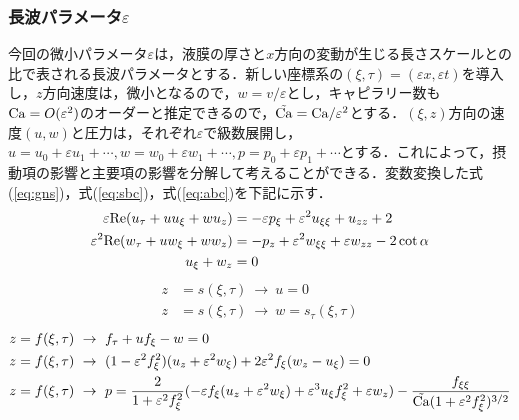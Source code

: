 \documentclass[autodetect-engine,dvipdfmx-if-dvi,ja=standard,a4paper,11pt]{bxjsarticle} %
\begin{document}
\subsubsection{長波パラメータ$\varepsilon$}
今回の微小パラメータ$\varepsilon$は，液膜の厚さと$x$方向の変動が生じる長さスケールとの比で表される長波パラメータとする．新しい座標系の$(\xi,\tau)=(\varepsilon x,\varepsilon t)$を導入し，$z$方向速度は，微小となるので，$w=v/\varepsilon$とし，キャピラリー数も${\rm Ca}=O(\varepsilon^2)$のオーダーと推定できるので，$\tilde{\rm Ca}={\rm Ca}/\varepsilon^2$とする．$(\xi,z)$方向の速度$(u,w)$と圧力は，それぞれ$\varepsilon$で級数展開し，$u=u_0+\varepsilon u_1+\cdots,w=w_0+\varepsilon w_1+\cdots,p=p_0+\varepsilon p_1+\cdots$とする．これによって，摂動項の影響と主要項の影響を分解して考えることができる．変数変換した式(\ref{eq:gns})，式(\ref{eq:sbc})，式(\ref{eq:abc})を下記に示す．
\begin{subequations}
\begin{align}
\varepsilon{\rm Re}(u_\tau+uu_\xi+wu_z)&=-\varepsilon p_\xi+\varepsilon^2u_{\xi\xi}+u_{zz}+2\label{eq:egns1}\\
\varepsilon^2{\rm Re}(w_\tau+uw_\xi+ww_z)&=-p_z+\varepsilon^2w_{\xi\xi}+\varepsilon w_{zz}-2\cot\alpha\label{eq:egns2}\\
u_\xi+w_z&=0\label{eq:egmass}
\end{align}
\label{eq:egns}
\end{subequations}
\begin{subequations}
\begin{align}
z&=s(\xi,\tau)\ \rightarrow\ u=0\label{eq:esbc1}\\
z&=s(\xi,\tau)\ \rightarrow\ w=s_\tau(\xi,\tau)\label{eq:esbc2}
\end{align}
\label{eq:esbc}
\end{subequations}
\begin{subequations}
\begin{align}
z&=f(\xi,\tau)\ \rightarrow\ f_\tau+uf_\xi-w=0\label{eq:eabc1}\\
z&=f(\xi,\tau)\ \rightarrow\ (1-\varepsilon^2f_\xi^2)(u_z+\varepsilon^2w_\xi)+2\varepsilon^2f_\xi(w_z-u_\xi)=0\label{eq:eabc2}\\
z&=f(\xi,\tau)\ \rightarrow\ p=\frac{2}{1+\varepsilon^2f_\xi^2}(-\varepsilon f_\xi(u_z+\varepsilon^2w_\xi)+\varepsilon^3u_\xi f_\xi^2+\varepsilon w_z)-\frac{f_{\xi\xi}}{\tilde{\rm Ca}(1+\varepsilon^2f_\xi^2)^{3/2}}\label{eq:eabc3}
\end{align}
\label{eq:eabc}
\end{subequations}
\end{document}
